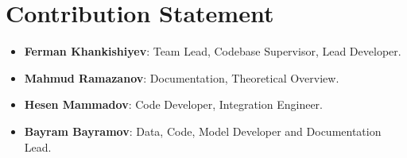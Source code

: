 \documentclass[sigconf,screen,nonacm,nofonts]{acmart}
\begin{document}
\section{Contribution Statement}
\begin{itemize}
    \item \textbf{Ferman Khankishiyev}: Team Lead, Codebase Supervisor, Lead Developer.
    \item \textbf{Mahmud Ramazanov}: Documentation, Theoretical Overview.
    \item \textbf{Hesen Mammadov}: Code Developer, Integration Engineer.
    \item \textbf{Bayram Bayramov}: Data, Code, Model Developer and Documentation Lead.
\end{itemize}
\end{document}
